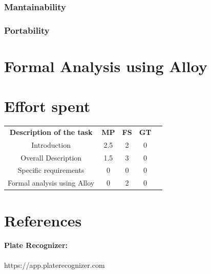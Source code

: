 \documentclass{article}
\begin{document}
\subsubsection{Mantainability}
\subsubsection{Portability}

\newpage
\section{Formal Analysis using Alloy}

\newpage
\section{Effort spent}
\begin{center}
    \begin{tabular}{c|c|c|c|c}
        \hline
        \textbf{Description of the task} & \textbf{MP} & \textbf{FS} &
        \textbf{GT} \\
        Introduction                    & 2.5   & 2     & 0     \\
        Overall Description             & 1.5   & 3   & 0     \\
        Specific requirements           & 0     & 0     & 0     \\
        Formal analysis using Alloy     & 0     & 2     & 0     \\
    \end{tabular}
\end{center}
\section{References}
    \paragraph{Plate Recognizer:} https://app.platerecognizer.com
    
\end{document}
